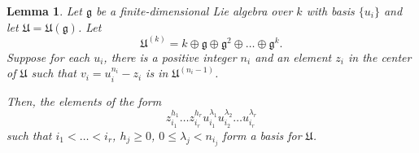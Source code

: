 \documentclass[12pt]{article}
\theoremstyle{thmstyle}
\newtheorem{lemma}[theorem]{Lemma}
\theoremstyle{defstyle}
\newcommand{\frakg}{\mathfrak{g}}
\newcommand{\frakU}{\mathfrak{U}}
\renewcommand{\le}{\leqslant}
\renewcommand{\ge}{\geqslant}
\begin{document}
\begin{lemma}
    Let $\frakg$ be a finite-dimensional Lie algebra over $k$ with basis $\{u_i\}$ and let $\frakU = \frakU(\frakg)$. Let 
    \begin{equation*}
        \frakU^{(k)} = k\oplus\frakg\oplus\frakg^2\oplus\dots\oplus\frakg^k.
    \end{equation*}
    Suppose for each $u_i$, there is a positive integer $n_i$ and an element $z_i$ in the center of $\frakU$ such that $v_i = u_i^{n_i} - z_i$ is in $\frakU^{(n_i - 1)}$.

    Then, the elements of the form 
    \begin{equation*}
        z_{i_1}^{h_1}\dots z_{i_r}^{h_r}u_{i_1}^{\lambda_1}u_{i_2}^{\lambda_2}\dots u_{i_r}^{\lambda_r}
    \end{equation*}
    such that $i_1 < \dots < i_r$, $h_j\ge 0$, $0\le\lambda_j < n_{i_j}$ form a basis for $\frakU$.
\end{lemma}
\end{document}
